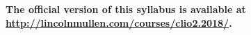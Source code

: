 
\textbf{The official version of this syllabus is available at 
\url{http://lincolnmullen.com/courses/clio2.2018/}.}

